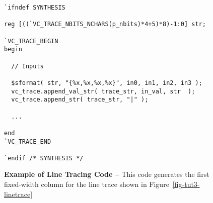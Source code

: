 
\begin{figure}

\begin{lstlisting}[xleftmargin=1in]
`ifndef SYNTHESIS

reg [((`VC_TRACE_NBITS_NCHARS(p_nbits)*4+5)*8)-1:0] str;

`VC_TRACE_BEGIN
begin

  // Inputs

  $sformat( str, "{%x,%x,%x,%x}", in0, in1, in2, in3 );
  vc_trace.append_val_str( trace_str, in_val, str  );
  vc_trace.append_str( trace_str, "|" );

  ...

end
`VC_TRACE_END

`endif /* SYNTHESIS */
\end{lstlisting}%

  \caption{\textbf{Example of Line Tracing Code --} This code generates
    the first fixed-width column for the line trace shown in
    Figure~\ref{fig-tut3-linetrace}}
  \label{code-tut3-linetrace}

\end{figure}

